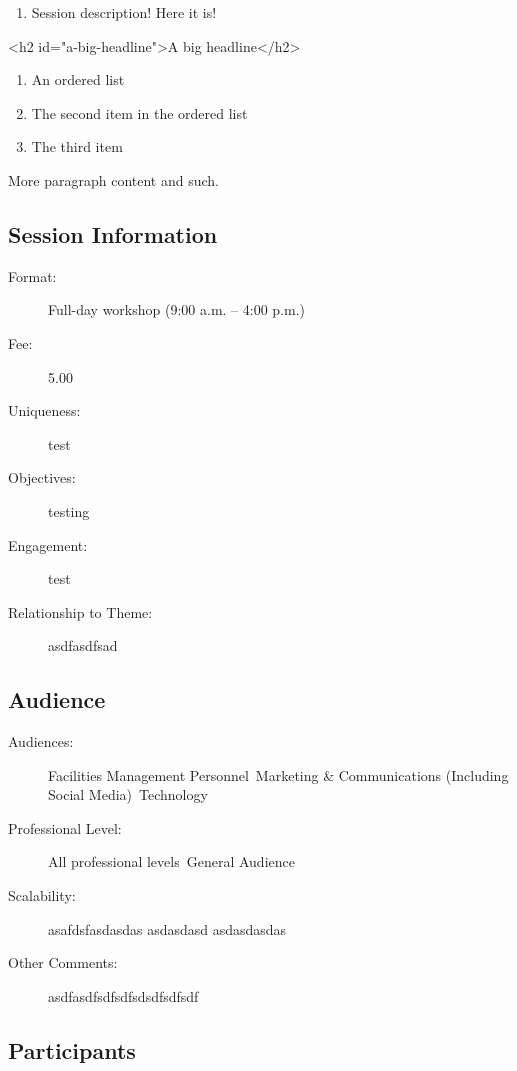 \documentclass{report}
\begin{document}
              \begin{enumerate}
\item Session description! Here it is!
\end{enumerate}
<h2 id="a-big-headline">A big headline</h2>
\begin{enumerate}
\item An ordered list
\item The second item in the ordered list
\item The third item
\end{enumerate}
More paragraph content and such.

              \subsection*{Session Information}
                \begin{description}
                  \item [Format:] Full-day workshop (9:00 a.m. – 4:00 p.m.)
							    
								  \item [Fee:]5.00
							     
							    \item [Uniqueness:]test
							    \item [Objectives:]testing
							    \item [Engagement:]test
							    \item [Relationship to Theme:]asdfasdfsad
							    
                \end{description}
              \subsection*{Audience}
                \begin{description}
                  \item [Audiences:]Facilities Management Personnel~Marketing \& Communications (Including Social Media)~Technology~
                  \item[Professional Level:]All professional levels~General Audience~
                \item[Scalability:] asafdsfasdasdas
asdasdasd
asdasdasdas

							
              \item[Other Comments:] asdfasdfsdfsdfsdsdfsdfsdf
              \end{description}
            \subsection*{Participants}
\end{document}
